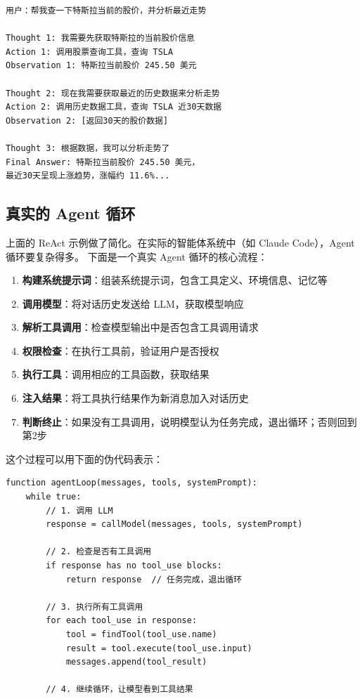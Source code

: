 \begin{verbatim}
用户：帮我查一下特斯拉当前的股价，并分析最近走势

Thought 1: 我需要先获取特斯拉的当前股价信息
Action 1: 调用股票查询工具，查询 TSLA
Observation 1: 特斯拉当前股价 245.50 美元

Thought 2: 现在我需要获取最近的历史数据来分析走势
Action 2: 调用历史数据工具，查询 TSLA 近30天数据
Observation 2: [返回30天的股价数据]

Thought 3: 根据数据，我可以分析走势了
Final Answer: 特斯拉当前股价 245.50 美元，
最近30天呈现上涨趋势，涨幅约 11.6%...
\end{verbatim}

\subsection{真实的 Agent 循环}

上面的 ReAct 示例做了简化。在实际的智能体系统中（如 Claude Code），Agent 循环要复杂得多。
下面是一个真实 Agent 循环的核心流程：

\begin{enumerate}
    \item \textbf{构建系统提示词}：组装系统提示词，包含工具定义、环境信息、记忆等
    \item \textbf{调用模型}：将对话历史发送给 LLM，获取模型响应
    \item \textbf{解析工具调用}：检查模型输出中是否包含工具调用请求
    \item \textbf{权限检查}：在执行工具前，验证用户是否授权
    \item \textbf{执行工具}：调用相应的工具函数，获取结果
    \item \textbf{注入结果}：将工具执行结果作为新消息加入对话历史
    \item \textbf{判断终止}：如果没有工具调用，说明模型认为任务完成，退出循环；否则回到第2步
\end{enumerate}

这个过程可以用下面的伪代码表示：

\begin{verbatim}
function agentLoop(messages, tools, systemPrompt):
    while true:
        // 1. 调用 LLM
        response = callModel(messages, tools, systemPrompt)

        // 2. 检查是否有工具调用
        if response has no tool_use blocks:
            return response  // 任务完成，退出循环

        // 3. 执行所有工具调用
        for each tool_use in response:
            tool = findTool(tool_use.name)
            result = tool.execute(tool_use.input)
            messages.append(tool_result)

        // 4. 继续循环，让模型看到工具结果
\end{verbatim}

